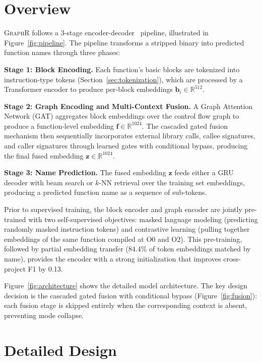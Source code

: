 \documentclass[sigconf,nonacm]{acmart}
\newcommand{\sysname}{\textsc{GraphR}}
\begin{document}
\section{Overview}
\label{sec:overview}

\sysname{} follows a 3-stage encoder-decoder~\cite{seq2seq} pipeline, illustrated in Figure~\ref{fig:pipeline}. The pipeline transforms a stripped binary into predicted function names through three phases:

\textbf{Stage 1: Block Encoding.} Each function's basic blocks are tokenized into instruction-type tokens (Section~\ref{sec:tokenization}), which are processed by a Transformer encoder to produce per-block embeddings $\mathbf{b}_i \in \mathbb{R}^{512}$.

\textbf{Stage 2: Graph Encoding and Multi-Context Fusion.} A Graph Attention Network (GAT) aggregates block embeddings over the control flow graph to produce a function-level embedding $\mathbf{f} \in \mathbb{R}^{1024}$. The cascaded gated fusion mechanism then sequentially incorporates external library calls, callee signatures, and caller signatures through learned gates with conditional bypass, producing the final fused embedding $\mathbf{z} \in \mathbb{R}^{1024}$.

\textbf{Stage 3: Name Prediction.} The fused embedding $\mathbf{z}$ feeds either a GRU decoder with beam search or $k$-NN retrieval over the training set embeddings, producing a predicted function name as a sequence of sub-tokens.

Prior to supervised training, the block encoder and graph encoder are jointly pre-trained with two self-supervised objectives: masked language modeling (predicting randomly masked instruction tokens) and contrastive learning (pulling together embeddings of the same function compiled at O0 and O2). This pre-training, followed by partial embedding transfer (84.4\% of token embeddings matched by name), provides the encoder with a strong initialization that improves cross-project F1 by 0.13.

Figure~\ref{fig:architecture} shows the detailed model architecture. The key design decision is the cascaded gated fusion with conditional bypass (Figure~\ref{fig:fusion}): each fusion stage is skipped entirely when the corresponding context is absent, preventing mode collapse.

\section{Detailed Design}
\label{sec:design}
\end{document}
